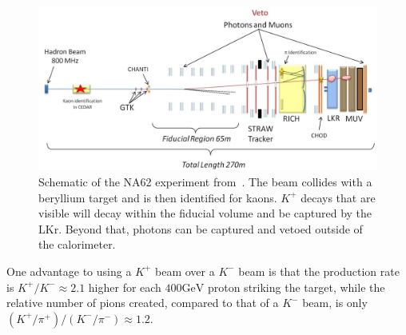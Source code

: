 \begin{figure}[h]
    \centering
    \includegraphics[width=\textwidth]{Figures/experiments/na62_schematic}
    \caption{Schematic of the NA62 experiment from~\cite{Martellotti:2015kna}. The beam collides with a beryllium target and is then identified for kaons. $K^+$ decays that are visible will decay within the fiducial volume and be captured by the LKr. Beyond that, photons can be captured and vetoed outside of the calorimeter.}
    \label{fig:na62_experiment}
\end{figure}

One advantage to using a $K^+$ beam over a $K^-$ beam is that the production rate is $K^+ / K^- \approx 2.1$ higher for each $400\textrm{GeV}$ proton striking the target, while the relative number of pions created, compared to that of a $K^-$ beam, is only $(K^+ / \pi^+) / (K^- / \pi^-) \approx 1.2$.
